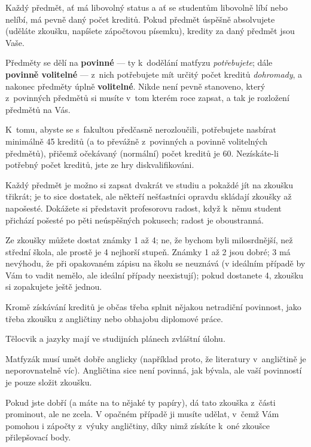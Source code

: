 
Každý předmět, ať má libovolný status a ať se studentům libovolně líbí nebo nelíbí, má pevně daný počet kreditů. Pokud předmět úspěšně absolvujete (uděláte zkoušku, napíšete zápočtovou písemku), kredity za daný předmět jsou Vaše.

Předměty se dělí na {\bf povinné} --- ty k~dodělání matfyzu {\it potřebujete}; dále {\bf povinně volitelné} --- z~nich potřebujete mít určitý počet kreditů {\it dohromady}, a nakonec předměty úplně {\bf volitelné}. Nikde není pevně stanoveno, který z~povinných předmětů si musíte v~tom kterém roce zapsat, a tak je rozložení předmětů na Vás.

K~tomu, abyste se s~fakultou předčasně nerozloučili, potřebujete
nasbírat minimálně 45 kreditů (a to převážně z~povinných a povinně
volitelných předmětů), přičemž očekávaný (normální) počet kreditů
je 60. 
Nezískáte-li potřebný počet kreditů, jste ze hry diskvalifikováni.

Každý předmět je možno si zapsat dvakrát ve studiu a pokaždé jít na zkoušku třikrát; je to sice dostatek, ale někteří nešťastníci opravdu skládají zkoušky až napošesté. Dokážete si představit profesorovu radost, když k~němu student přichází pošesté po pěti neúspěšných pokusech; radost je oboustranná.

Ze zkoušky můžete dostat známky 1 až 4; ne, že bychom byli milosrdnější, než střední škola, ale prostě je 4 nejhorší stupeň. Známky 1 až 2 jsou dobré; 3 má nevýhodu, že při opakovaném zápisu na školu se neuznává (v ideálním případě by Vám to vadit nemělo, ale ideální případy neexistují); pokud dostanete 4, zkoušku si zopakujete ještě jednou.

Kromě získávání kreditů je občas
třeba splnit nějakou netradiční povinnost, jako třeba zkoušku
z angličtiny nebo obhajobu diplomové práce.



Tělocvik a jazyky mají ve studijních plánech zvláštní úlohu.

Matfyzák musí umět dobře anglicky (například proto, že literatury v~angličtině je neporovnatelně víc). Angličtina sice není povinná, jak bývala, ale vaší povinností je pouze
složit zkoušku. 

Pokud jste dobří (a máte na to nějaké ty papíry), dá tato zkouška z~části prominout, ale ne zcela. V opačném případě ji musíte udělat, v~čemž Vám pomohou i zápočty z~výuky angličtiny, díky nimž získáte k~oné zkoušce přilepšovací body.

